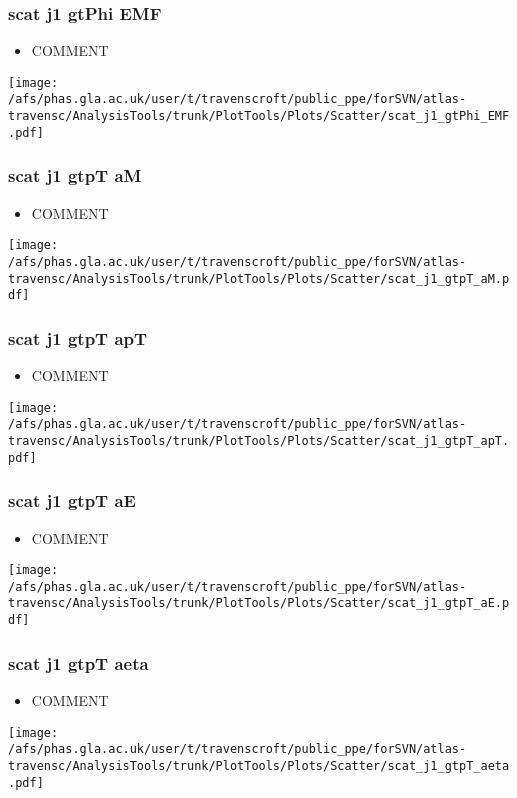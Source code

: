 \documentclass{beamer}
\begin{document}
\begin{frame}
\frametitle{scat j1 gtPhi EMF}
\begin{itemize}
\item COMMENT
\end{itemize}
\begin{center}
\texttt{[image: /afs/phas.gla.ac.uk/user/t/travenscroft/public\_ppe/forSVN/atlas-travensc/AnalysisTools/trunk/PlotTools/Plots/Scatter/scat\_j1\_gtPhi\_EMF.pdf]}
\end{center}
\end{frame}

\begin{frame}
\frametitle{scat j1 gtpT aM}
\begin{itemize}
\item COMMENT
\end{itemize}
\begin{center}
\texttt{[image: /afs/phas.gla.ac.uk/user/t/travenscroft/public\_ppe/forSVN/atlas-travensc/AnalysisTools/trunk/PlotTools/Plots/Scatter/scat\_j1\_gtpT\_aM.pdf]}
\end{center}
\end{frame}

\begin{frame}
\frametitle{scat j1 gtpT apT}
\begin{itemize}
\item COMMENT
\end{itemize}
\begin{center}
\texttt{[image: /afs/phas.gla.ac.uk/user/t/travenscroft/public\_ppe/forSVN/atlas-travensc/AnalysisTools/trunk/PlotTools/Plots/Scatter/scat\_j1\_gtpT\_apT.pdf]}
\end{center}
\end{frame}

\begin{frame}
\frametitle{scat j1 gtpT aE}
\begin{itemize}
\item COMMENT
\end{itemize}
\begin{center}
\texttt{[image: /afs/phas.gla.ac.uk/user/t/travenscroft/public\_ppe/forSVN/atlas-travensc/AnalysisTools/trunk/PlotTools/Plots/Scatter/scat\_j1\_gtpT\_aE.pdf]}
\end{center}
\end{frame}

\begin{frame}
\frametitle{scat j1 gtpT aeta}
\begin{itemize}
\item COMMENT
\end{itemize}
\begin{center}
\texttt{[image: /afs/phas.gla.ac.uk/user/t/travenscroft/public\_ppe/forSVN/atlas-travensc/AnalysisTools/trunk/PlotTools/Plots/Scatter/scat\_j1\_gtpT\_aeta.pdf]}
\end{center}
\end{frame}
\end{document}
